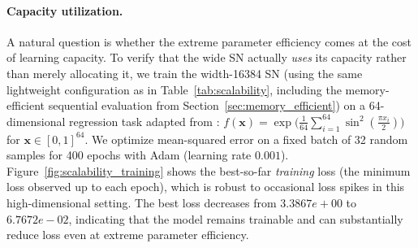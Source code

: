 \documentclass{article}
\theoremstyle{plain}
\theoremstyle{definition}
\theoremstyle{remark}
\begin{document}
\paragraph{Capacity utilization.}
A natural question is whether the extreme parameter efficiency comes at the cost of learning capacity. To verify that the wide SN actually \emph{uses} its capacity rather than merely allocating it, we train the width-16384 SN (using the same lightweight configuration as in Table~\ref{tab:scalability}, including the memory-efficient sequential evaluation from Section~\ref{sec:memory_efficient}) on a 64-dimensional regression task adapted from \cite{liu2024kan}: $f(\mathbf{x}) = \exp\bigl(\frac{1}{64}\sum_{i=1}^{64} \sin^2(\frac{\pi x_i}{2})\bigr)$ for $\mathbf{x} \in [0,1]^{64}$. We optimize mean-squared error on a fixed batch of 32 random samples for 400 epochs with Adam (learning rate $0.001$). Figure~\ref{fig:scalability_training} shows the best-so-far \emph{training} loss (the minimum loss observed up to each epoch), which is robust to occasional loss spikes in this high-dimensional setting. The best loss decreases from $3.3867e+00$ to $6.7672e-02$, indicating that the model remains trainable and can substantially reduce loss even at extreme parameter efficiency.
\end{document}
